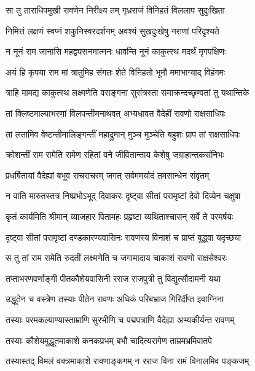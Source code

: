 
\twolineshloka
{सा तु ताराधिपमुखी रावणेन निरीक्ष्य तम्}
{गृध्रराजं विनिहतं विललाप सुदुःखिता} %

\twolineshloka
{निमित्तं लक्षणं स्वप्नं शकुनिस्वरदर्शनम्}
{अवश्यं सुखदुःखेषु नराणां परिदृश्यते} %

\twolineshloka
{न नूनं राम जानासि महद्व्यसनमात्मनः}
{धावन्ति नूनं काकुत्स्थ मदर्थं मृगपक्षिणः} %

\twolineshloka
{अयं हि कृपया राम मां त्रातुमिह संगतः}
{शेते विनिहतो भूमौ ममाभाग्याद् विहंगमः} %

\twolineshloka
{त्राहि मामद्य काकुत्स्थ लक्ष्मणेति वराङ्गना}
{सुसंत्रस्ता समाक्रन्दच्छृण्वतां तु यथान्तिके} %

\twolineshloka
{तां क्लिष्टमाल्याभरणां विलपन्तीमनाथवत्}
{अभ्यधावत वैदेहीं रावणो राक्षसाधिपः} %

\twolineshloka
{तां लतामिव वेष्टन्तीमालिङ्गन्तीं महाद्रुमान्}
{मुञ्च मुञ्चेति बहुशः प्राप तां राक्षसाधिपः} %

\twolineshloka
{क्रोशन्तीं राम रामेति रामेण रहितां वने}
{जीवितान्ताय केशेषु जग्राहान्तकसंनिभः} %

\twolineshloka
{प्रधर्षितायां वैदेह्यां बभूव सचराचरम्}
{जगत् सर्वममर्यादं तमसान्धेन संवृतम्} %

\twolineshloka
{न वाति मारुतस्तत्र निष्प्रभोऽभूद् दिवाकरः}
{दृष्ट्वा सीतां परामृष्टां देवो दिव्येन चक्षुषा} %

\twolineshloka
{कृतं कार्यमिति श्रीमान् व्याजहार पितामहः}
{प्रहृष्टा व्यथिताश्चासन् सर्वे ते परमर्षयः} %

\twolineshloka
{दृष्ट्वा सीतां परामृष्टां दण्डकारण्यवासिनः}
{रावणस्य विनाशं च प्राप्तं बुद्ध्वा यदृच्छया} %

\twolineshloka
{स तु तां राम रामेति रुदतीं लक्ष्मणेति च}
{जगामादाय चाकाशं रावणो राक्षसेश्वरः} %

\twolineshloka
{तप्ताभरणवर्णाङ्गी पीतकौशेयवासिनी}
{रराज राजपुत्री तु विद्युत्सौदामनी यथा} %

\twolineshloka
{उद्धूतेन च वस्त्रेण तस्याः पीतेन रावणः}
{अधिकं परिबभ्राज गिरिर्दीप्त इवाग्निना} %

\twolineshloka
{तस्याः परमकल्याण्यास्ताम्राणि सुरभीणि च}
{पद्मपत्राणि वैदेह्या अभ्यकीर्यन्त रावणम्} %

\twolineshloka
{तस्याः कौशेयमुद्धूतमाकाशे कनकप्रभम्}
{बभौ चादित्यरागेण ताम्रमभ्रमिवातपे} %

\twolineshloka
{तस्यास्तद् विमलं वक्त्रमाकाशे रावणाङ्कगम्}
{न रराज विना रामं विनालमिव पङ्कजम्} %

